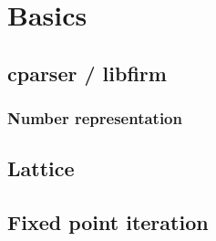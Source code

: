 \chapter{Basics}\label{sec:basics}

\section{cparser / libfirm}
\subsection{Number representation}
\section{Lattice}
\section{Fixed point iteration}
